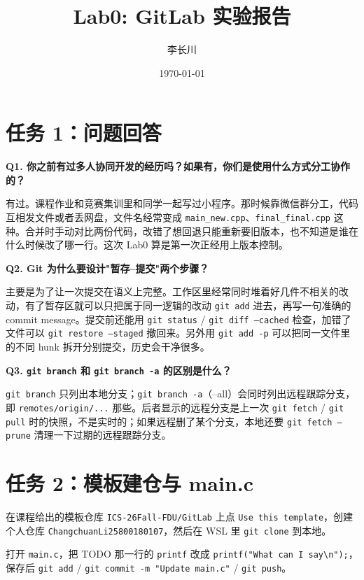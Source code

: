 \documentclass[11pt]{article}
\title{Lab0: GitLab 实验报告}
\author{李长川 \quad 25800180107}
\date{\today}
\begin{document}
\maketitle

\section{任务 1：问题回答}

\textbf{Q1. 你之前有过多人协同开发的经历吗？如果有，你们是使用什么方式分工协作的？}

\par 有过。课程作业和竞赛集训里和同学一起写过小程序。那时候靠微信群分工，代码互相发文件或者丢网盘，文件名经常变成 \texttt{main\_new.cpp}、\texttt{final\_final.cpp} 这种。合并时手动对比两份代码，改错了想回退只能重新要旧版本，也不知道是谁在什么时候改了哪一行。这次 Lab0 算是第一次正经用上版本控制。

\textbf{Q2. Git 为什么要设计"暂存--提交"两个步骤？}

\par 主要是为了让一次提交在语义上完整。工作区里经常同时堆着好几件不相关的改动，有了暂存区就可以只把属于同一逻辑的改动 \texttt{git add} 进去，再写一句准确的 commit message。提交前还能用 \texttt{git status} / \texttt{git diff --cached} 检查，加错了文件可以 \texttt{git restore --staged} 撤回来。另外用 \texttt{git add -p} 可以把同一文件里的不同 hunk 拆开分别提交，历史会干净很多。

\textbf{Q3. \texttt{git branch} 和 \texttt{git branch -a} 的区别是什么？}

\par \texttt{git branch} 只列出本地分支；\texttt{git branch -a}（--all）会同时列出远程跟踪分支，即 \texttt{remotes/origin/...} 那些。后者显示的远程分支是上一次 \texttt{git fetch} / \texttt{git pull} 时的快照，不是实时的；如果远程删了某个分支，本地还要 \texttt{git fetch --prune} 清理一下过期的远程跟踪分支。

\section{任务 2：模板建仓与 main.c}

\par 在课程给出的模板仓库 \texttt{ICS-26Fall-FDU/GitLab} 上点 \texttt{Use this template}，创建个人仓库 \texttt{ChangchuanLi25800180107}，然后在 WSL 里 \texttt{git clone} 到本地。

\par 打开 \texttt{main.c}，把 TODO 那一行的 \texttt{printf} 改成 \texttt{printf("What can I say\textbackslash n");}，保存后 \texttt{git add} / \texttt{git commit -m "Update main.c"} / \texttt{git push}。
\end{document}
